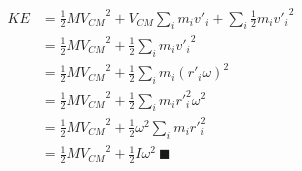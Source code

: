 \documentclass[letterpaper]{article}
\begin{document}
\begin{align}
   KE &= \frac{1}{2}  M {V_{CM}}^2+ V_{CM}\sum_i  m_i v'_i+\sum_i  \frac{1}{2} m_i {v'_i}^2 \\
   &= \frac{1}{2}  M {V_{CM}}^2+\frac{1}{2} \sum_i m_i {v'_i}^2 \\
   &= \frac{1}{2}  M {V_{CM}}^2+\frac{1}{2} \sum_i m_i ( r'_i \omega )^2 \\ 
   &= \frac{1}{2}  M {V_{CM}}^2+\frac{1}{2} \sum_i m_i r'_i^2 \omega^2  \\
   &= \frac{1}{2}  M {V_{CM}}^2+\frac{1}{2} \omega^2 \sum_i m_i r'_i^2   \\
   &= \frac{1}{2}  M {V_{CM}}^2+\frac{1}{2} I \omega^2\ \blacksquare
\end{align}
\end{document}
